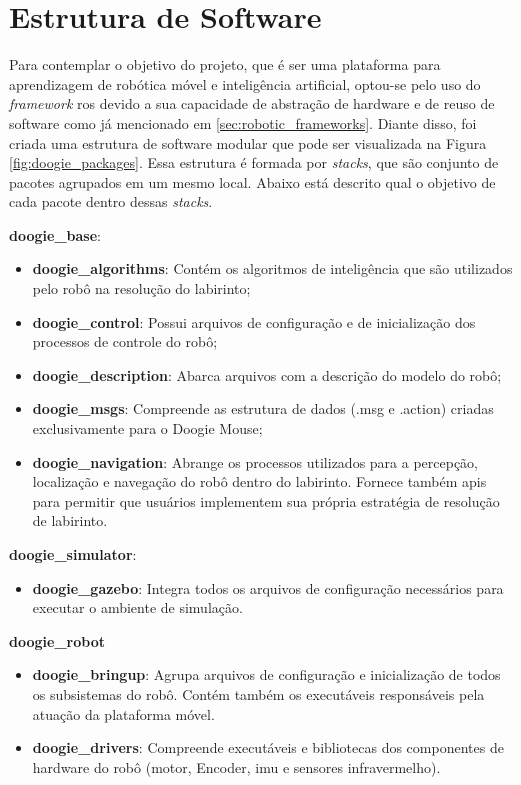 \section{Estrutura de Software}
\label{sec:resultado_estrutura_de_software}
Para contemplar o objetivo do projeto, que é ser uma plataforma para aprendizagem de robótica móvel e inteligência artificial, optou-se pelo uso do \textit{framework} \gls*{ros} devido a sua capacidade de abstração de hardware e de reuso de software como já mencionado em \ref{sec:robotic_frameworks}. Diante disso, foi criada uma estrutura de software modular que pode ser visualizada na Figura \ref{fig:doogie_packages}. Essa estrutura é formada por \textit{stacks}, que são conjunto de pacotes agrupados em um mesmo local. Abaixo está descrito qual o objetivo de cada pacote dentro dessas \textit{stacks}.

\textbf{doogie\_base}:
\begin{itemize}
	\item \textbf{doogie\_algorithms}: Contém os algoritmos de inteligência que são utilizados pelo robô na resolução do labirinto;
	\item \textbf{doogie\_control}: Possui arquivos de configuração e de inicialização dos processos de controle do robô;
	\item \textbf{doogie\_description}: Abarca arquivos com a descrição do modelo do robô;
	\item \textbf{doogie\_msgs}: Compreende as estrutura de dados (.msg e .action) criadas exclusivamente para o Doogie Mouse;
	\item \textbf{doogie\_navigation}: Abrange os processos utilizados para a percepção, localização e navegação do robô dentro do labirinto. Fornece também \glspl*{api} para permitir que usuários implementem sua própria estratégia de resolução de labirinto.   
\end{itemize}
	
\textbf{doogie\_simulator}:
\begin{itemize}
	\item \textbf{doogie\_gazebo}: Integra todos os arquivos de configuração necessários para executar o ambiente de simulação.
\end{itemize}
	
\textbf{doogie\_robot}
\begin{itemize}
	\item \textbf{doogie\_bringup}: Agrupa arquivos de configuração e inicialização de todos os subsistemas do robô. Contém também os executáveis responsáveis pela atuação da plataforma móvel.  
	\item \textbf{doogie\_drivers}: Compreende executáveis e bibliotecas dos componentes de hardware do robô (motor, Encoder, \gls*{imu} e sensores infravermelho).
\end{itemize}
	
